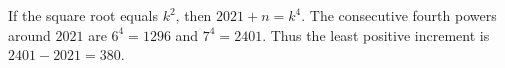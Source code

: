 If the square root equals $k^2$, then $2021+n=k^4$. The consecutive fourth powers around $2021$ are $6^4=1296$ and $7^4=2401$. Thus the least positive increment is $2401-2021=\boxed{380}$.
